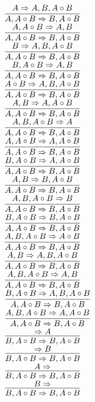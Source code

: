 \documentclass[11pt]{article}
\begin{document}
\begin{center}
\bigskip
\\$\infer{A, A\circ B\Rightarrow B, A\circ B}{A\Rightarrow A, B, A\circ B}$
\bigskip
\\$\infer{A, A\circ B\Rightarrow B, A\circ B}{A, A\circ B\Rightarrow A, B}$
\bigskip
\\$\infer{A, A\circ B\Rightarrow B, A\circ B}{B\Rightarrow A, B, A\circ B}$
\bigskip
\\$\infer{A, A\circ B\Rightarrow B, A\circ B}{B, A\circ B\Rightarrow A, B}$
\bigskip
\\$\infer{A, A\circ B\Rightarrow B, A\circ B}{A\circ B\Rightarrow A, B, A\circ B}$
\bigskip
\\$\infer{A, A\circ B\Rightarrow B, A\circ B}{A, B\Rightarrow A, A\circ B}$
\bigskip
\\$\infer{A, A\circ B\Rightarrow B, A\circ B}{A, B, A\circ B\Rightarrow A}$
\bigskip
\\$\infer{A, A\circ B\Rightarrow B, A\circ B}{A, A\circ B\Rightarrow A, A\circ B}$
\bigskip
\\$\infer{A, A\circ B\Rightarrow B, A\circ B}{B, A\circ B\Rightarrow A, A\circ B}$
\bigskip
\\$\infer{A, A\circ B\Rightarrow B, A\circ B}{A, B\Rightarrow B, A\circ B}$
\bigskip
\\$\infer{A, A\circ B\Rightarrow B, A\circ B}{A, B, A\circ B\Rightarrow B}$
\bigskip
\\$\infer{A, A\circ B\Rightarrow B, A\circ B}{B, A\circ B\Rightarrow B, A\circ B}$
\bigskip
\\$\infer{A, A\circ B\Rightarrow B, A\circ B}{A, B, A\circ B\Rightarrow A\circ B}$
\bigskip
\\$\infer{A, A\circ B\Rightarrow B, A\circ B}{A, B\Rightarrow A, B, A\circ B}$
\bigskip
\\$\infer{A, A\circ B\Rightarrow B, A\circ B}{A, B, A\circ B\Rightarrow A, B}$
\bigskip
\\$\infer{A, A\circ B\Rightarrow B, A\circ B}{B, A\circ B\Rightarrow A, B, A\circ B}$
\bigskip
\\$\infer{A, A\circ B\Rightarrow B, A\circ B}{A, B, A\circ B\Rightarrow A, A\circ B}$
\bigskip
\\$\infer{B, A\circ B\Rightarrow B, A\circ B}{\Rightarrow A}$
\bigskip
\\$\infer{B, A\circ B\Rightarrow B, A\circ B}{\Rightarrow B}$
\bigskip
\\$\infer{B, A\circ B\Rightarrow B, A\circ B}{A\Rightarrow }$
\bigskip
\\$\infer{B, A\circ B\Rightarrow B, A\circ B}{B\Rightarrow }$

\end{center}
\end{document}
